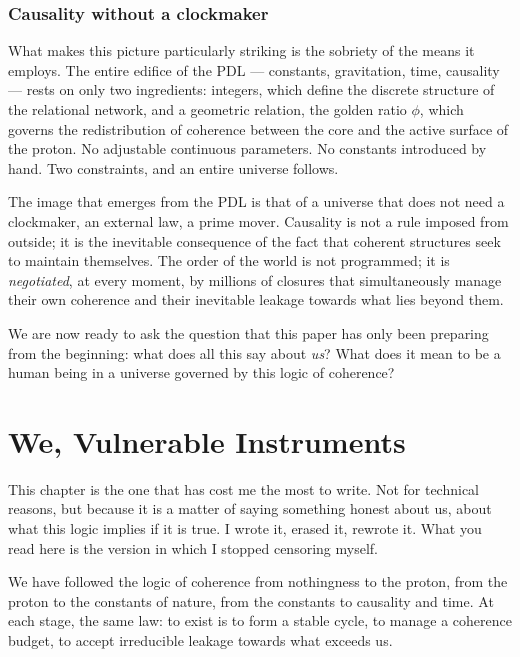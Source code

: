 \documentclass[11pt, a4paper, openright]{book}
\begin{document}
\subsection*{Causality without a clockmaker}

What makes this picture particularly striking is the sobriety of the means it employs. The entire edifice of the PDL — constants, gravitation, time, causality — rests on only two ingredients: integers, which define the discrete structure of the relational network, and a geometric relation, the golden ratio $\phi$, which governs the redistribution of coherence between the core and the active surface of the proton. No adjustable continuous parameters. No constants introduced by hand. Two constraints, and an entire universe follows.

\medskip

The image that emerges from the PDL is that of a universe that does not need a clockmaker, an external law, a prime mover. Causality is not a rule imposed from outside; it is the inevitable consequence of the fact that coherent structures seek to maintain themselves. The order of the world is not programmed; it is \emph{negotiated}, at every moment, by millions of closures that simultaneously manage their own coherence and their inevitable leakage towards what lies beyond them.

\medskip

We are now ready to ask the question that this paper has only been preparing from the beginning: what does all this say about \emph{us}? What does it mean to be a human being in a universe governed by this logic of coherence?

\chapter{We, Vulnerable Instruments}

This chapter is the one that has cost me the most to write. Not for technical reasons, but because it is a matter of saying something honest about us, about what this logic implies if it is true. I wrote it, erased it, rewrote it. What you read here is the version in which I stopped censoring myself.

\medskip

We have followed the logic of coherence from nothingness to the proton, from the proton to the constants of nature, from the constants to causality and time. At each stage, the same law: to exist is to form a stable cycle, to manage a coherence budget, to accept irreducible leakage towards what exceeds us.
\end{document}
